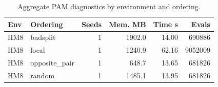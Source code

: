 \begin{table}[t]
\centering
\caption{Aggregate PAM diagnostics by environment and ordering.}
\label{tab:pam-final-table}
\begin{tabular}{llrrrr}
\toprule
Env & Ordering & Seeds & Mem. MB & Time s & Evals \\
\midrule
HM8 & badsplit & 1 & 1902.0 & 14.00 & 690886 \\
HM8 & local & 1 & 1240.9 & 62.16 & 9052009 \\
HM8 & opposite\_pair & 1 & 648.7 & 13.65 & 681826 \\
HM8 & random & 1 & 1485.1 & 13.95 & 681826 \\
\bottomrule
\end{tabular}
\end{table}

